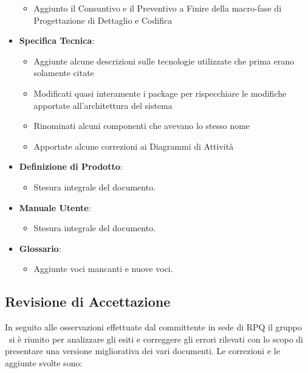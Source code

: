 \begin{itemize}
\begin{itemize}
		\item Aggiunto il Consuntivo e il Preventivo a Finire della macro-fase di Progettazione di Dettaglio e Codifica
	\end{itemize}	
	\item \textbf{Specifica Tecnica}:
	\begin{itemize}
		\item Aggiunte alcune descrizioni sulle tecnologie utilizzate che prima erano solamente citate
		\item Modificati quasi interamente i package per rispecchiare le modifiche apportate all'architettura del sistema
		\item Rinominati alcuni componenti che avevano lo stesso nome
		\item Apportate alcune correzioni ai Diagrammi di Attività
	\end{itemize}
	\item \textbf{Definizione di Prodotto}:
	\begin{itemize}
		\item Stesura integrale del documento.
	\end{itemize}
	\item \textbf{Manuale Utente}:
	\begin{itemize}
		\item Stesura integrale del documento.
	\end{itemize}	
	\item \textbf{Glossario}:
	\begin{itemize}
		\item Aggiunte voci mancanti e nuove voci.
	\end{itemize}
\end{itemize}

\subsection{Revisione di Accettazione}
In seguito alle osservazioni effettuate dal committente in sede di RPQ il gruppo \gruppo\ si è riunito per analizzare gli esiti e correggere gli errori rilevati con lo scopo di presentare una versione migliorativa dei vari documenti.
Le correzioni e le aggiunte svolte sono:

